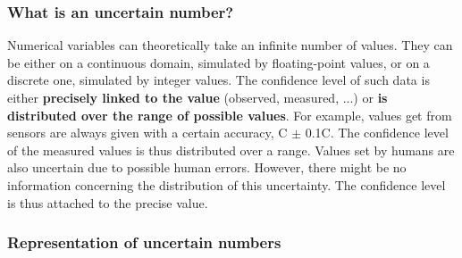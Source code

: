 \subsubsection{What is an uncertain number?}
Numerical variables can theoretically take an infinite number of values. 
They can be either on a continuous domain, simulated by floating-point values, or on a discrete one, simulated by integer values.
The confidence level of such data is either \textbf{precisely linked to the value} (observed, measured, ...) or \textbf{is distributed over the range of possible values}.
For example, values get from sensors are always given with a certain accuracy, \degree C $\pm$ 0.1\degree C.
The confidence level of the measured values is thus distributed over a range.
Values set by humans are also uncertain due to possible human errors.
However, there might be no information concerning the distribution of this uncertainty.
The confidence level is thus attached to the precise value.

\subsubsection{Representation of uncertain numbers}
\label{subsubsec:d-u-repr-unum}


